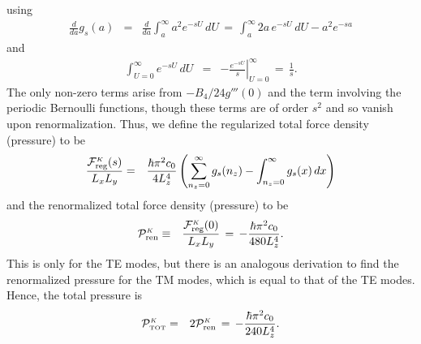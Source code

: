\documentclass[sections]{tjwNOTES}
\newcommand\man[1]{\mathcal{#1}}
\newcommand\nz{n_{z}}
\newcommand\Lx{L_{x}}
\newcommand\Ly{L_{y}}
\newcommand\Lz{L_{z}}
\newcommand\K{\mbox{\tiny $K$}}
\newcommand\TOT{\mbox{\tiny TOT}}
\begin{document}
using
\begin{eqnarray*}
    \frac{d}{da}g_{s}(a) &=&  \frac{d}{da}\int_{a}^{\infty} a^{2}e^{-sU} \,dU \,=\, \int_{a}^{\infty} 2a\,e^{-sU} \,dU - a^{2}e^{-sa}
\end{eqnarray*}
and
\begin{eqnarray*}
    \int_{U=0}^{\infty}e^{-sU}\,dU &=& \left.-\frac{e^{-sU}}{s}\right|_{U=0}^{\infty} \,=\, \frac{1}{s}.
\end{eqnarray*}
The only non-zero terms arise from $-B_{4}/24 g'''(0)$ and the term involving the periodic Bernoulli functions, though these terms are of order $s^{2}$ and so vanish upon renormalization. Thus, we define the regularized total force density (pressure) to be
\begin{eqnarray*}
    \frac{\man{F}^{\K}_{\text{reg}}(s)}{\Lx\Ly} &=& \frac{\hbar\pi^{2}c_{0}}{4\Lz^{4}} \left( \sum_{\nz=0}^{\infty} g_{s}(\nz) - \int_{\nz=0}^{\infty}g_{s}(x)\,dx\right)
\end{eqnarray*}
and the renormalized total force density (pressure) to be
\begin{eqnarray*}
    \man{P}^{\K}_{\text{ren}} &\equiv& \frac{\man{F}^{\K}_{\text{reg}}(0)}{\Lx\Ly} \,=\, -\frac{\hbar\pi^{2}c_{0}}{480 \Lz^{4}}.
\end{eqnarray*}
This is only for the TE modes, but there is an analogous derivation to find the renormalized pressure for the TM modes, which is equal to that of the TE modes. Hence, the total pressure is
\begin{eqnarray*}
    \man{P}^{\K}_{\TOT} &=& 2\man{P}^{\K}_{\text{ren}} \,=\, -\frac{\hbar\pi^{2}c_{0}}{240 \Lz^{4}}.
\end{eqnarray*}






\newpage
\appendix
\end{document}
